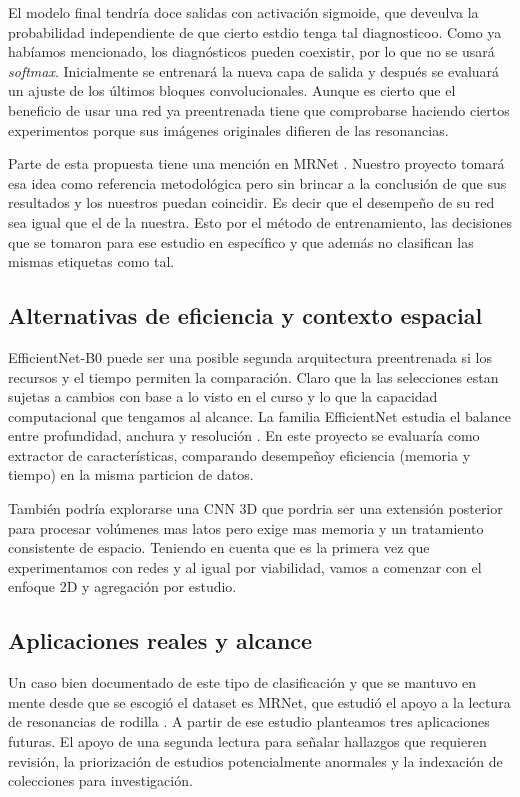 \documentclass[eng]{ajceam-class}
\begin{document}
El modelo final tendría doce salidas con activación sigmoide, que deveulva la probabilidad independiente de que cierto estdio tenga tal diagnosticoo. Como ya habíamos mencionado, los diagnósticos pueden coexistir, por lo que no se usará \textit{softmax}. Inicialmente se entrenará la nueva capa de salida y después se evaluará un ajuste de los últimos bloques convolucionales. Aunque es cierto que el beneficio de usar una red ya preentrenada tiene que comprobarse haciendo ciertos experimentos porque sus imágenes originales difieren de las resonancias.

Parte de esta propuesta tiene una mención en MRNet \cite{bien2018}. Nuestro proyecto tomará esa idea como referencia metodológica pero sin brincar a la conclusión de que sus resultados y los nuestros puedan coincidir. Es decir que el desempeño de su red sea igual que el de la nuestra. Esto por el método de entrenamiento, las decisiones que se tomaron para ese estudio en específico y que además no clasifican las mismas etiquetas como tal.

\subsection{Alternativas de eficiencia y contexto espacial}

EfficientNet-B0 puede ser una posible segunda arquitectura preentrenada si los recursos y el tiempo permiten la comparación. Claro que la las selecciones estan sujetas a cambios con base a lo visto en el curso y lo que la capacidad computacional que tengamos al alcance. La familia EfficientNet estudia el balance entre profundidad, anchura y resolución \cite{tan2019}. En este proyecto se evaluaría como extractor de características, comparando desempeñoy eficiencia (memoria y tiempo) en la misma particion de datos.

También podría explorarse una CNN 3D que pordria ser una extensión posterior para procesar volúmenes mas latos pero exige mas memoria y un tratamiento consistente de espacio. Teniendo en cuenta que es la primera vez que experimentamos con redes y al igual por viabilidad, vamos a comenzar con el enfoque 2D y agregación por estudio.

\subsection{Aplicaciones reales y alcance}

Un caso bien documentado de este tipo de clasificación y que se mantuvo en mente desde que se escogió el dataset es MRNet, que estudió el apoyo a la lectura de resonancias de rodilla \cite{bien2018}. A partir de ese estudio planteamos tres aplicaciones futuras. El apoyo de una segunda lectura para señalar hallazgos que requieren revisión, la priorización de estudios potencialmente anormales y la indexación de colecciones para investigación.
\end{document}
